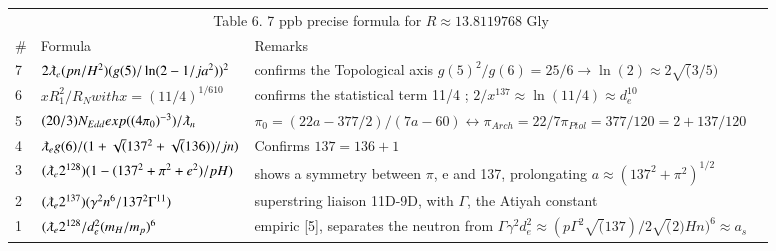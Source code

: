 \documentclass[a4paper,9pt]{article}
\begin{document}
\begin{table}
\label{tab:6:table6}
  \hskip-2.0cm\begin{tabular}{llll}
    \toprule
    \multicolumn{3}{c}{Table 6. 7 ppb precise formula for $R \approx 13.8119768$ Gly}                   \\
    \cmidrule(r){1-3}
    \#     & Formula  & Remarks \\
    \midrule
    
    
   
    7 & $2\lambdabar_{e} (pn/H^{2})(g(5)/\ln(2-1/ja^2))^2$   & confirms the Topological axis $g(5)^2/g(6) = 25/6 \rightarrow \ln(2) \approx 2\sqrt(3/5)$  \\
    
    6 & $xR_1^2/R_N with x = (11/4)^{1/610}$ &  confirms the statistical term 11/4 ; $2/x^{137} \approx \ln(11/4) \approx d_e^{10}$ \\
    
    5 & $(20/3)N_{Edd} exp((4 \pi_0)^{-3})/\lambdabar_n$ & $\pi_0 =  (22a - 377/2)/(7a - 60) \leftrightarrow \pi_{Arch} = 22/7  \pi_{Ptol} = 377/120 = 2 + 137/120$  \\
    
     4 & $\lambdabar_{e} g(6)/(1+\sqrt(137^2+\sqrt(136))/jn)$  & Confirms $137=136+1$ \\
    3 & $(\lambdabar_{e} 2^{128})(1-(137^2+\pi^2+e^2)/pH)$ & shows a symmetry between $\pi$, e and 137, prolongating $ a \approx (137^2 + \pi^2)^{1/2}$ \\
     2 & $(\lambdabar_{e} 2^{137})(\gamma^2 n^6 / 137^2 \Gamma^{11})$ & superstring liaison 11D-9D, with $\Gamma$, the Atiyah constant \\
    1 & $(\lambdabar_{e} 2^{128}/d_e^2(m_H/m_p)^6$  & empiric [5], separates the neutron from $\Gamma \gamma^2 d_e^2 \approx (p\Gamma^2 \sqrt(137)/2 \sqrt(2) Hn)^6 \approx a_s$ \\
    
    \bottomrule
  \end{tabular}
\end{table}


% 


\end{document}
